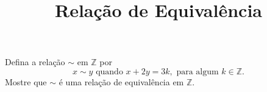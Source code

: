 \documentclass{beamer}
\title{Relação de Equivalência}
\author[\autor]{\autor}
\institute[\instituto]{\instituto}
\date{}
\begin{document}
    \begin{frame}
        \maketitle
    \end{frame}


    \begin{frame}
        \begin{exercicio}
            Defina a relação $\sim$ em $\mathbb{Z}$ por
            \[
                x \sim y \mbox{ quando } x + 2y = 3k,\mbox{ para algum } k \in \mathbb{Z}.
            \]
            Mostre que $\sim$ é uma relação de equivalência em $\mathbb{Z}$.
        \end{exercicio}

        \vspace{6cm}
    \end{frame}
\end{document}
